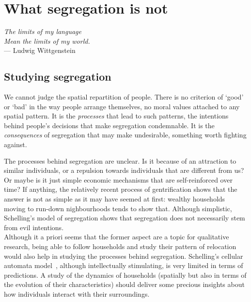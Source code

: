 \chapter{What segregation is not}
\label{chap:segregation_introduction}

\begin{flushright}{\slshape    
The limits of my language\\
Mean the limits of my world.} \\ \medskip
--- Ludwig Wittgenstein~\cite{Wittgenstein:1998}
\end{flushright}


\bigskip


\newcommand{\E}{\mathrm{E}}
\newcommand{\Var}{\mathrm{Var}}

\section{Studying segregation}
\label{sec:studying_segregation}


We cannot judge the spatial repartition of people. There is no criterion of
`good' or `bad' in the way people arrange themselves, no moral values attached
to any spatial pattern. It is the \emph{processes} that lead to such patterns,
the intentions behind people's decisions that make segregation condemnable. It
is the \emph{consequences} of segregation that may make undesirable, something
worth fighting against. 

The processes behind segregation are unclear. Is it
because of an attraction to similar individuals, or a repulsion towards
individuals that are different from us? Or maybe is it just simple economic
mechanisms that are self-reinforced over time? If anything, the relatively
recent process of gentrification shows that the answer is not as simple as it
may have seemed at first: wealthy households moving to run-down nighbourhoods
tends to show that. Although simplistic, Schelling's model of segregation shows
that segregation does not necessarily stem from evil intentions.\\
Although it a priori seems that
the former aspect are a topic for qualitative research, being able to follow
households and study their pattern of relocation would also help in studying
the processes behind segregation. Schelling's cellular automata
model~\cite{Schelling:1971}, although intellectually stimulating, is very
limited in terms of predictions. A study of the dynamics of households
(spatially but also in terms of the evolution of their characteristics) should
deliver some precious insights about how individuals interact with their
surroundings.

